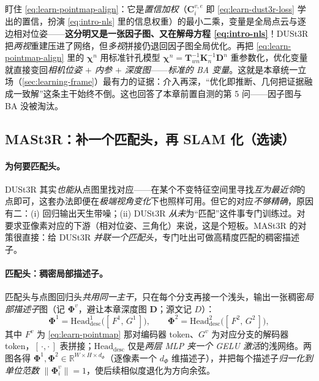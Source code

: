 \begin{insight}
盯住 \cref{eq:learn-pointmap-align}：它是\emph{置信加权}（$\mathbf{C}^{v,e}_i$ 即 \cref{eq:learn-dust3r-loss} 学出的置信，扮演 \cref{eq:intro-nls} 里的信息权重）的最小二乘，变量是全局点云与逐边相对位姿——\textbf{这分明又是一张因子图、又在解母方程 \cref{eq:intro-nls}}！DUSt3R 把\emph{两视}重建压进了网络，但\emph{多视}拼接仍退回因子图全局优化。再把 \cref{eq:learn-pointmap-align} 里的 $\boldsymbol\chi^n$ 用标准针孔模型 $\boldsymbol\chi^n=\mathbf{T}_{wn}^{-1}\mathbf{K}_n^{-1}\mathbf{D}^n$ 重参数化，优化变量就直接变回\emph{相机位姿 $+$ 内参 $+$ 深度图}——\emph{标准的 BA 变量}。这就是本章统一立场（\cref{sec:learning-frame}）最有力的证据：介入再深，“优化即推断、几何把证据融成一致解”这条主干始终不倒。这也回答了本章前置自测的第 5 问——因子图与 BA 没被淘汰。
\end{insight}

\subsection{MASt3R：补一个匹配头，再 SLAM 化（选读）}
\label{sec:learning-pointmap-mast3r}

\paragraph{为何要匹配头。}
DUSt3R 其实\emph{也能}从点图里找对应——在某个不变特征空间里寻找\emph{互为最近邻}的点即可，这套办法即便在\emph{极端视角变化}下也照样可用\cite{leroy2024mast3r}。但它的对应\emph{不够精确}，原因有二：(i) 回归输出天生带噪；(ii) DUSt3R \emph{从未}为“匹配”这件事专门训练过。对要求亚像素对应的下游（相对位姿、三角化）来说，这是个短板。MASt3R 的对策很直接：给 DUSt3R \emph{并联一个匹配头}，专门吐出可做高精度匹配的稠密描述子。

\paragraph{匹配头：稠密局部描述子。}
匹配头与点图回归头\emph{共用同一主干}，只在每个分支再接一个浅头，输出一张稠密\emph{局部描述子}图（记 $\boldsymbol\Phi^v$，避让本章深度图 $\mathbf{D}$；源文记 $D$）：
\begin{equation}
  \boldsymbol\Phi^1=\mathrm{Head}^1_{\mathrm{desc}}\big([\,F^1,\,G^1\,]\big),\qquad
  \boldsymbol\Phi^2=\mathrm{Head}^2_{\mathrm{desc}}\big([\,F^2,\,G^2\,]\big),
  \label{eq:learn-mast3r-desc}
\end{equation}
其中 $F^v$ 为 \cref{eq:learn-pointmap} 那对编码器 token、$G^v$ 为对应分支的解码器 token，$[\,\cdot,\cdot\,]$ 表拼接；$\mathrm{Head}_{\mathrm{desc}}$ 仅是\emph{两层 MLP 夹一个 GELU 激活}的浅网络。两图各得 $\boldsymbol\Phi^1,\boldsymbol\Phi^2\in\mathbb{R}^{W\times H\times d_\Phi}$（逐像素一个 $d_\Phi$ 维描述子），并把每个描述子\emph{归一化到单位范数} $\|\boldsymbol\Phi^v_i\|=1$，使后续相似度退化为方向余弦。

